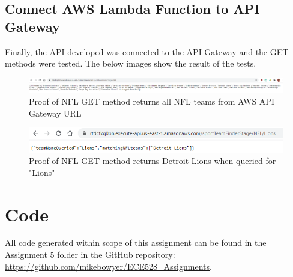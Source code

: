 \documentclass[12pt, letterpaper, final, onecolumn, titlepage] {article}
\begin{document}
\subsection{Connect AWS Lambda Function to API Gateway}
Finally, the API developed was connected to the API Gateway and the GET methods were tested. The below images show the result of the tests.

\begin{figure}[htbp]
	\centerline{\includegraphics[scale=.4]{3/NFLResult.png}}
	\caption{Proof of NFL GET method returns all NFL teams from AWS API Gateway URL }
	\label{getNFL}
\end{figure}
\begin{figure}[htbp]
	\centerline{\includegraphics[scale=.4]{3/NFLLions.png}}
	\caption{Proof of NFL GET method returns Detroit Lions when queried for "Lions"}
	\label{getLions}
\end{figure}

\section{Code}

All code generated within scope of this assignment can be found in the Assignment 5 folder in the GitHub repository:
\url{https://github.com/mikebowyer/ECE528_Assignments}.
\end{document}
